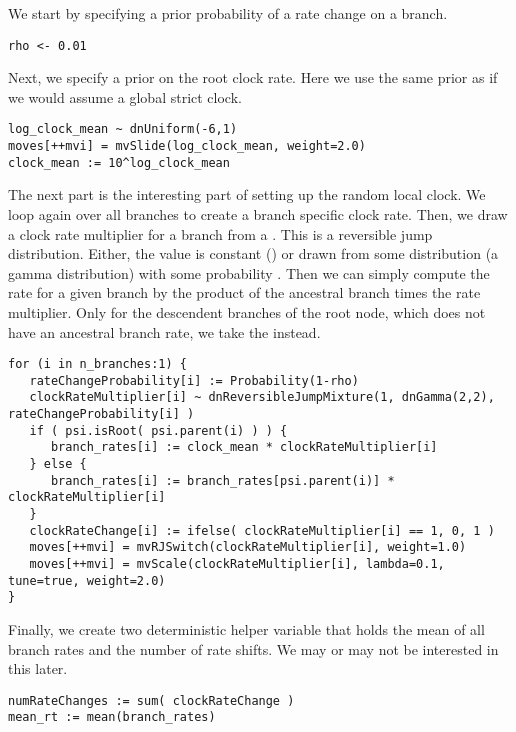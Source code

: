 We start by specifying a prior probability of a rate change on a branch.
{\tt \begin{snugshade*}
\begin{lstlisting}
rho <- 0.01
\end{lstlisting}
\end{snugshade*}}
Next, we specify a prior on the root clock rate.
Here we use the same prior as if we would assume a global strict clock.
{\tt \begin{snugshade*}
\begin{lstlisting}
log_clock_mean ~ dnUniform(-6,1)
moves[++mvi] = mvSlide(log_clock_mean, weight=2.0)
clock_mean := 10^log_clock_mean
\end{lstlisting}
\end{snugshade*}}

The next part is the interesting part of setting up the random local clock.
We loop again over all branches to create a branch specific clock rate.
Then, we draw a clock rate multiplier for a branch from a .
This is a reversible jump distribution.
Either, the value is constant () or drawn from some distribution (\EG a gamma distribution) with some probability .
Then we can simply compute the rate for a given branch by the product of the ancestral branch times the rate multiplier.
Only for the descendent branches of the root node, which does not have an ancestral branch rate, we take the  instead.
{\tt \begin{snugshade*}
\begin{lstlisting}
for (i in n_branches:1) {
   rateChangeProbability[i] := Probability(1-rho)
   clockRateMultiplier[i] ~ dnReversibleJumpMixture(1, dnGamma(2,2), rateChangeProbability[i] )
   if ( psi.isRoot( psi.parent(i) ) ) {
      branch_rates[i] := clock_mean * clockRateMultiplier[i]
   } else {
      branch_rates[i] := branch_rates[psi.parent(i)] * clockRateMultiplier[i]
   }
   clockRateChange[i] := ifelse( clockRateMultiplier[i] == 1, 0, 1 )
   moves[++mvi] = mvRJSwitch(clockRateMultiplier[i], weight=1.0)
   moves[++mvi] = mvScale(clockRateMultiplier[i], lambda=0.1, tune=true, weight=2.0)
}
\end{lstlisting}
\end{snugshade*}}

Finally, we create two deterministic helper variable that holds the mean of all branch rates and the number of rate shifts.
We may or may not be interested in this later.
{\tt \begin{snugshade*}
\begin{lstlisting}
numRateChanges := sum( clockRateChange )
mean_rt := mean(branch_rates)
\end{lstlisting}
\end{snugshade*}}




